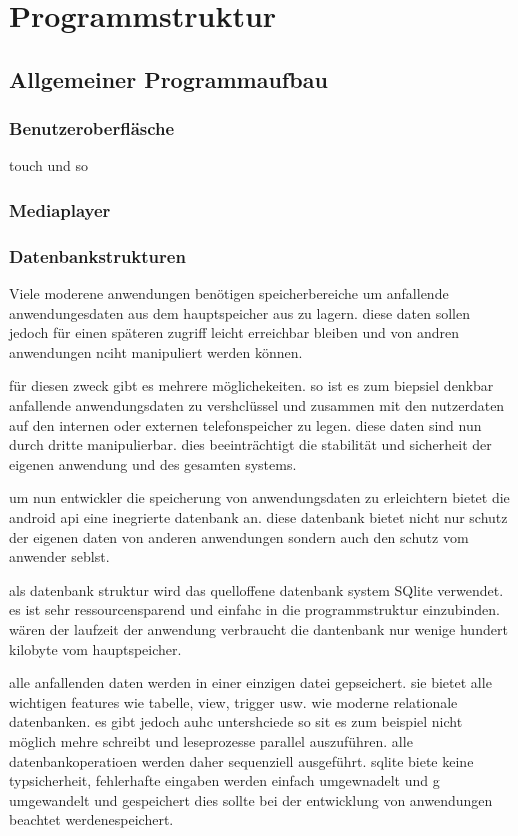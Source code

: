 \section{Programmstruktur}
\subsection{Allgemeiner Programmaufbau}
\subsubsection{Benutzeroberfläsche}
touch und so
\subsubsection{Mediaplayer}
\subsubsection{Datenbankstrukturen}
\label{Datenbankstrukturen}
Viele moderene anwendungen benötigen speicherbereiche um anfallende anwendungesdaten aus dem hauptspeicher aus zu lagern. diese daten sollen jedoch für einen späteren zugriff leicht erreichbar bleiben und von andren anwendungen nciht manipuliert werden können.

für diesen zweck gibt es mehrere möglichekeiten. so ist es zum biepsiel denkbar anfallende anwendungsdaten zu vershclüssel und zusammen mit den nutzerdaten auf den internen oder externen telefonspeicher zu legen. diese daten sind nun durch dritte manipulierbar. dies beeinträchtigt die stabilität und sicherheit der eigenen anwendung und des gesamten systems.

um nun entwickler die speicherung von anwendungsdaten zu erleichtern bietet die android api eine inegrierte datenbank an. diese datenbank bietet nicht nur schutz der eigenen daten von anderen anwendungen sondern auch den schutz vom anwender seblst.

als datenbank struktur wird das quelloffene datenbank system SQlite verwendet. es ist sehr ressourcensparend und einfahc in die programmstruktur einzubinden. wären der laufzeit der anwendung verbraucht die dantenbank nur wenige hundert kilobyte vom hauptspeicher.

alle anfallenden daten werden in einer einzigen datei gepseichert. sie bietet alle wichtigen features wie tabelle, view, trigger usw. wie moderne relationale datenbanken. es gibt jedoch auhc untershciede so sit es zum beispiel nicht möglich mehre schreibt und leseprozesse parallel auszuführen. alle datenbankoperatioen werden daher sequenziell ausgeführt. sqlite biete keine typsicherheit, fehlerhafte eingaben werden einfach umgewnadelt und g umgewandelt und gespeichert dies sollte bei der entwicklung von anwendungen beachtet werdenespeichert.

